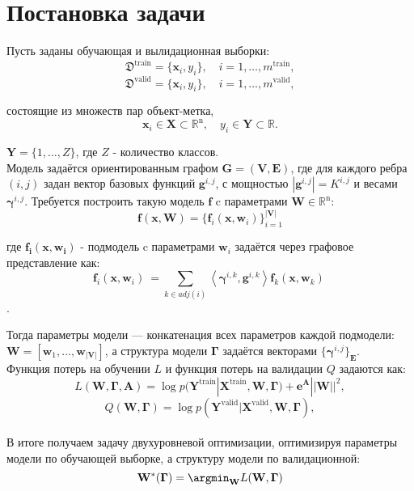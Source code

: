 \documentclass[12pt,twoside]{article}
\begin{document}
\section{ Постановка задачи}
Пусть заданы обучающая и вылидационная выборки:
\[
\mathfrak{D}^{\text{train}} = \{\mathbf{x}_i, y_i\}, \quad i=1,\dots,m^{\text{train}},
\]
\[
\mathfrak{D}^{\text{valid}} = \{\mathbf{x}_i, y_i\}, \quad i=1,\dots,m^{\text{valid}},
\]

состоящие из множеств пар объект-метка,
\[
\mathbf{x}_i\in\mathbf{X}\subset\mathbb{R}^{\text{n}},\quad y_i\in\mathbf{Y}\subset\mathbb{R}.
\] 

$\mathbf{Y}= \{1,\dots,Z\}$, где $Z$ - количество классов.
\\

Модель задаётся ориентированным графом $\mathbf{G=(V,E)}$, где для каждого ребра $(i,j)$ задан вектор базовых функций $\mathbf{g}^{i,j}$, с мощностью $|\mathbf{g}^{i,j}| = K^{i,j}$ и весами $\boldsymbol{\gamma}^{i,j}$. Требуется построить такую модель $\mathbf{f}$ c параметрами $\mathbf{W}\in\mathbb{R}^\text{n}$:
\[
\mathbf{f}(\mathbf{x}, \mathbf{W})= \{ \mathbf{f}_i(\mathbf{x}, \mathbf{w}_i)\}_{i=1}^\mathbf{|V|}
\]

где $\mathbf{f_i(x, w_i)}$ - подмодель c параметрами $\mathbf{w}_i$ задаётся через графовое представление как:
\[
\mathbf{f}_i(\mathbf{x}, \mathbf{w}_i)\ = \sum_{k\in adj(i)} \left\langle {\boldsymbol{\gamma}^{i,k}, \mathbf{g}^{i,k}} \right\rangle \mathbf{f}_k(\mathbf{x}, \mathbf{w}_k)\
\].

Тогда параметры модели --- конкатенация всех параметров каждой подмодели: \\ $\mathbf{W}=[\mathbf{w}_1,\dots,\mathbf{w}_\mathbf{|V|}]$, а структура модели $\boldsymbol{\Gamma}$ задаётся векторами $\{ \boldsymbol{\gamma}^{i,j}\}_\mathbf{E}$.
\\

Функция потерь на обучении $L$ и функция потерь на валидации $Q$ задаются как:
\[
L (\mathbf{W}, \boldsymbol{\Gamma}, \mathbf{A})= \log p(\mathbf{Y}^\text{train}|\mathbf{X}^\text{train}, \mathbf{W}, \boldsymbol{\Gamma}) + \boldsymbol{e}^{\mathbf{A}}||\mathbf{W}||^2,
\]
\[
Q (\mathbf{W}, \boldsymbol{\Gamma})= \log p(\mathbf{Y}^\text{valid}|\mathbf{X}^\text{valid}, \mathbf{W}, \boldsymbol{\Gamma}),
\]
\\
В итоге получаем задачу двухуровневой оптимизации, оптимизируя параметры модели по обучающей выборке, а структуру модели по валидационной: 
\[
\mathbf{W}^*( \boldsymbol{\Gamma}) = \argmin_{\mathbf{W}}
L (\mathbf{W}, \boldsymbol{\Gamma})\]
\end{document}
